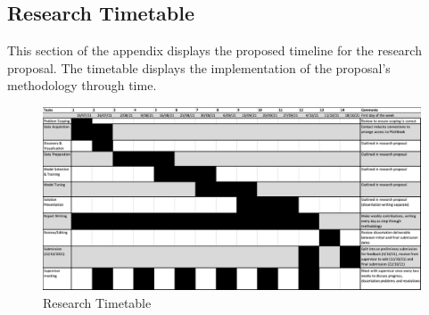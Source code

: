 \documentclass[12pt]{article}
\begin{document}
\begin{landscape}
\subsection{Research Timetable}\label{RT}
This section of the appendix displays the proposed timeline for the research proposal.
The timetable displays the implementation of the proposal's methodology through time.
\begin{figure}[H]
    \centering
    \includegraphics[width=1.5\textwidth]{rt.png}
    \caption{Research Timetable}
    \label{fig:rt}
\end{figure}
\end{landscape}
\end{document}
